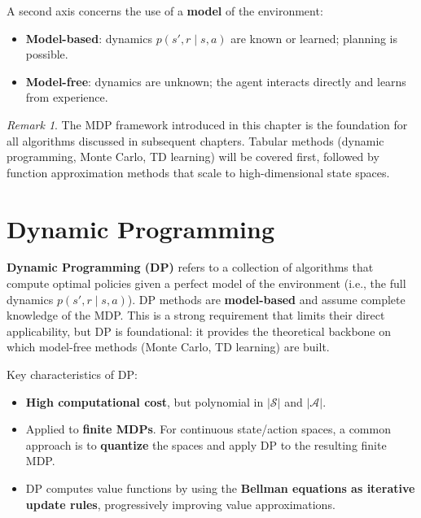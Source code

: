 \documentclass[11pt,a4paper]{article}
\theoremstyle{definition}
\theoremstyle{plain}
\theoremstyle{remark}
\newtheorem*{remark}{Remark}
\begin{document}
A second axis concerns the use of a \textbf{model} of the environment:
\begin{itemize}
    \item \textbf{Model-based}: dynamics $p(s', r \mid s, a)$ are known or learned; planning is possible.
    \item \textbf{Model-free}: dynamics are unknown; the agent interacts directly and learns from experience.
\end{itemize}

\begin{remark}
The MDP framework introduced in this chapter is the foundation for all algorithms discussed in subsequent chapters. Tabular methods (dynamic programming, Monte Carlo, TD learning) will be covered first, followed by function approximation methods that scale to high-dimensional state spaces.
\end{remark}


\part{Dynamic Programming}

\textbf{Dynamic Programming (DP)} refers to a collection of algorithms that compute optimal policies given a perfect model of the environment (i.e., the full dynamics $p(s', r \mid s, a)$). DP methods are \textbf{model-based} and assume complete knowledge of the MDP. This is a strong requirement that limits their direct applicability, but DP is foundational: it provides the theoretical backbone on which model-free methods (Monte Carlo, TD learning) are built.

Key characteristics of DP:
\begin{itemize}
    \item \textbf{High computational cost}, but polynomial in $|\mathcal{S}|$ and $|\mathcal{A}|$.
    \item Applied to \textbf{finite MDPs}. For continuous state/action spaces, a common approach is to \textbf{quantize} the spaces and apply DP to the resulting finite MDP.
    \item DP computes value functions by using the \textbf{Bellman equations as iterative update rules}, progressively improving value approximations.
\end{itemize}

\end{document}
